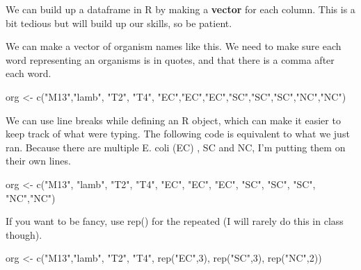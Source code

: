 \documentclass[
]{book}
\newenvironment{Shaded}{\begin{snugshade}}{\end{snugshade}}
\newcommand{\DecValTok}[1]{\textcolor[rgb]{0.00,0.00,0.81}{#1}}
\newcommand{\FunctionTok}[1]{\textcolor[rgb]{0.00,0.00,0.00}{#1}}
\newcommand{\NormalTok}[1]{#1}
\newcommand{\OtherTok}[1]{\textcolor[rgb]{0.56,0.35,0.01}{#1}}
\newcommand{\StringTok}[1]{\textcolor[rgb]{0.31,0.60,0.02}{#1}}
\begin{document}
We can build up a dataframe in R by making a \textbf{vector} for each column. This is a bit tedious but will build up our skills, so be patient.

We can make a vector of organism names like this. We need to make sure each word representing an organisms is in quotes, and that there is a comma after each word.

\begin{Shaded}
\begin{Highlighting}[]
\NormalTok{org }\OtherTok{\textless{}{-}} \FunctionTok{c}\NormalTok{(}\StringTok{"M13"}\NormalTok{,}\StringTok{"lamb"}\NormalTok{, }\StringTok{"T2"}\NormalTok{, }\StringTok{"T4"}\NormalTok{, }\StringTok{"EC"}\NormalTok{,}\StringTok{"EC"}\NormalTok{,}\StringTok{"EC"}\NormalTok{,}\StringTok{"SC"}\NormalTok{,}\StringTok{"SC"}\NormalTok{,}\StringTok{"SC"}\NormalTok{,}\StringTok{"NC"}\NormalTok{,}\StringTok{"NC"}\NormalTok{)}
\end{Highlighting}
\end{Shaded}

We can use line breaks while defining an R object, which can make it easier to keep track of what were typing. The following code is equivalent to what we just ran. Because there are multiple E. coli (EC) , SC and NC, I'm putting them on their own lines.

\begin{Shaded}
\begin{Highlighting}[]
\NormalTok{org }\OtherTok{\textless{}{-}} \FunctionTok{c}\NormalTok{(}\StringTok{"M13"}\NormalTok{, }\StringTok{"lamb"}\NormalTok{, }\StringTok{"T2"}\NormalTok{, }\StringTok{"T4"}\NormalTok{, }
         \StringTok{"EC"}\NormalTok{, }\StringTok{"EC"}\NormalTok{, }\StringTok{"EC"}\NormalTok{,}
         \StringTok{"SC"}\NormalTok{, }\StringTok{"SC"}\NormalTok{, }\StringTok{"SC"}\NormalTok{,}
         \StringTok{"NC"}\NormalTok{,}\StringTok{"NC"}\NormalTok{)}
\end{Highlighting}
\end{Shaded}

If you want to be fancy, use rep() for the repeated (I will rarely do this in class though).

\begin{Shaded}
\begin{Highlighting}[]
\NormalTok{org }\OtherTok{\textless{}{-}} \FunctionTok{c}\NormalTok{(}\StringTok{"M13"}\NormalTok{,}\StringTok{"lamb"}\NormalTok{, }\StringTok{"T2"}\NormalTok{, }\StringTok{"T4"}\NormalTok{,}
         \FunctionTok{rep}\NormalTok{(}\StringTok{"EC"}\NormalTok{,}\DecValTok{3}\NormalTok{),}
         \FunctionTok{rep}\NormalTok{(}\StringTok{"SC"}\NormalTok{,}\DecValTok{3}\NormalTok{),}
         \FunctionTok{rep}\NormalTok{(}\StringTok{"NC"}\NormalTok{,}\DecValTok{2}\NormalTok{))}
\end{Highlighting}
\end{Shaded}
\end{document}
